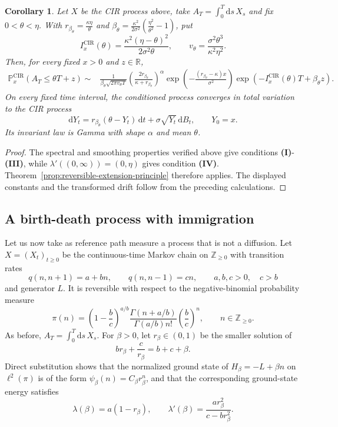 \documentclass[11pt,reqno]{amsart}
\newtheorem{corollary}[theorem]{Corollary}
\theoremstyle{definition}
\numberwithin{equation}{section}
\newcommand{\<}{\langle}
\renewcommand{\>}{\rangle}
\def\Z{{\mathbb Z}}
\def\Z{{\mathbb Z}}
\def\de{{\rm d}}
\def\de{{\mathrm {d}}}
\def\bbP{{\mathbb{P}}}
\begin{document}
\begin{corollary}
\label{cor:cir-extension}
Let $X$ be the CIR process above, take
$A_T=\int_0^T \de s \, X_s$
and fix $0<\theta<\eta$.  With $r_{\beta_\theta}=\frac{\kappa\eta}{\theta}$ and $\beta_\theta
      =\frac{\kappa^2}{2\sigma^2}
        \left(\frac{\eta^2}{\theta^2}-1\right)$,
put
\[
    I_x^{\mathrm{CIR}}(\theta)
      =\frac{\kappa^2(\eta-\theta)^2}{2\sigma^2\theta},
    \qquad
    v_\theta
      =\frac{\sigma^2\theta^3}{\kappa^2\eta^2}.
\]
Then, for every fixed $x>0$ and $z\in\mathbb R$,
\[
\begin{split}
    \bbP_x^{\mathrm{CIR}}(A_T\leq\theta T+z)
    \sim{}&
    \frac{1}{\beta_\theta\sqrt{2\pi v_\theta T}}
    \left(
       \frac{2r_{\beta_\theta}}
            {\kappa+r_{\beta_\theta}}
    \right)^\alpha
    \exp\!\left(
       -\frac{(r_{\beta_\theta}-\kappa)x}{\sigma^2}
    \right)
    \exp\!\left(
       -I_x^{\mathrm{CIR}}(\theta)T+\beta_\theta z
    \right).
\end{split}
\]
On every fixed time interval, the conditioned process converges in total
variation to the CIR process
\[
    \de Y_t
      =r_{\beta_\theta}(\theta-Y_t)\,\de t
       +\sigma\sqrt{Y_t}\,\de B_t,
    \qquad Y_0=x.
\]
Its invariant law is Gamma with shape $\alpha$ and mean $\theta$.
\end{corollary}

\begin{proof}
The spectral and smoothing properties verified above give
conditions \textbf{(I)}-\textbf{(III)}, while
$\lambda'((0,\infty))=(0,\eta)$ gives condition \textbf{(IV)}.
Theorem~\ref{prop:reversible-extension-principle} therefore applies.
The displayed constants and the transformed drift follow from the
preceding calculations.
\end{proof}


\subsection{A birth-death process with immigration}
Let us now take as reference path measure a process that is not a diffusion. Let
$X=(X_t)_{t\geq 0}$ be the continuous-time Markov chain on
$\Z_{\geq 0}$ with transition rates
\[
 q(n,n+1)=a+bn,
 \qquad
 q(n,n-1)=cn,
 \qquad
 a,b,c>0,\quad c>b
\]
and generator $L$.
It is reversible with respect to the negative-binomial probability
measure
\[
 \pi(n)
 =
 \left(1-\frac bc\right)^{a/b}
 \frac{\Gamma(n+a/b)}{\Gamma(a/b)n!}
 \left(\frac bc\right)^n,
 \qquad n\in\Z_{\geq 0}.
\]
As before, $A_T=\int_0^T \de s \, X_s$.
For $\beta>0$, let $r_\beta\in(0,1)$ be the smaller solution of
\[
 br_\beta+\frac{c}{r_\beta}=b+c+\beta.
\]
Direct substitution shows that the normalized ground state of
$H_\beta=-L+\beta n$ on $\ell^2(\pi)$
is of the form $\psi_\beta(n)=C_\beta r_\beta^n$, and that the
corresponding ground-state energy satisfies
\[
 \lambda(\beta)=a(1-r_\beta),
 \qquad
 \lambda'(\beta)=\frac{a r_\beta^2}{c-br_\beta^2}.
\]
\end{document}
